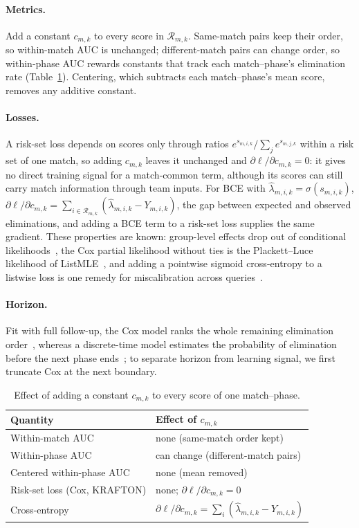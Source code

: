 \documentclass[sigconf,anonymous]{acmart}
\begin{document}
\paragraph{Metrics.}
Add a constant $c_{m,k}$ to every score in $\mathcal{R}_{m,k}$. Same-match pairs keep their order, so within-match AUC is unchanged; different-match pairs can change order, so within-phase AUC rewards constants that track each match--phase's elimination rate (Table~\ref{tab:account}). Centering, which subtracts each match--phase's mean score, removes any additive constant.

\paragraph{Losses.}
A risk-set loss depends on scores only through ratios $e^{s_{m,i,k}}/\sum_{j}e^{s_{m,j,k}}$ within a risk set of one match, so adding $c_{m,k}$ leaves it unchanged and $\partial\ell/\partial c_{m,k}=0$: it gives no direct training signal for a match-common term, although its scores can still carry match information through team inputs. For BCE with $\hat\lambda_{m,i,k}=\sigma(s_{m,i,k})$, $\partial\ell/\partial c_{m,k}=\sum_{i\in\mathcal{R}_{m,k}}(\hat\lambda_{m,i,k}-Y_{m,i,k})$, the gap between expected and observed eliminations, and adding a BCE term to a risk-set loss supplies the same gradient. These properties are known: group-level effects drop out of conditional likelihoods~\cite{Chamberlain80}, the Cox partial likelihood without ties is the Plackett--Luce likelihood of ListMLE~\cite{Xia08}, and adding a pointwise sigmoid cross-entropy to a listwise loss is one remedy for miscalibration across queries~\cite{Bai23}.

\paragraph{Horizon.}
Fit with full follow-up, the Cox model ranks the whole remaining elimination order~\cite{Cox72}, whereas a discrete-time model estimates the probability of elimination before the next phase ends~\cite{SingerWillett93,Gensheimer19}; to separate horizon from learning signal, we first truncate Cox at the next boundary.

\begin{table}[t]
\centering\footnotesize
\caption{Effect of adding a constant $c_{m,k}$ to every score of one match--phase.}
\label{tab:account}
\setlength{\tabcolsep}{3pt}
\begin{tabular}{ll}
\toprule
Quantity & Effect of $c_{m,k}$ \\
\midrule
Within-match AUC & none (same-match order kept) \\
Within-phase AUC & can change (different-match pairs) \\
Centered within-phase AUC & none (mean removed) \\
Risk-set loss (Cox, KRAFTON) & none; $\partial\ell/\partial c_{m,k}=0$ \\
Cross-entropy & $\partial\ell/\partial c_{m,k}=\sum_{i}(\hat\lambda_{m,i,k}-Y_{m,i,k})$ \\
\bottomrule
\end{tabular}
\end{table}
\end{document}
